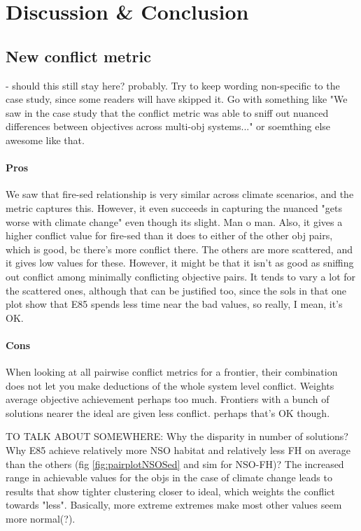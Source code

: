 \section{Discussion \& Conclusion}
\subsection{New conflict metric} - should this still stay here? probably. Try to keep wording non-specific to the case study, since some readers will have skipped it. Go with something like "We saw in the case study that the conflict metric was able to sniff out nuanced differences between objectives across multi-obj systems..." or soemthing else awesome like that.

\paragraph{Pros}
We saw that fire-sed relationship is very similar across climate scenarios, and the metric captures this. However, it even succeeds in capturing the nuanced "gets worse with climate change" even though its slight. Man o man.
Also, it gives a higher conflict value for fire-sed than it does to either of the other obj pairs, which is good, bc there's more conflict there. The others are more scattered, and it gives low values for these.
However, it might be that it isn't as good as sniffing out conflict among minimally conflicting objective pairs. It tends to vary a lot for the scattered ones, although that can be justified too, since the sols in that one plot show that E85 spends less time near the bad values, so really, I mean, it's OK.

\paragraph{Cons}
When looking at all pairwise conflict metrics for a frontier, their combination does not let you make deductions of the whole system level conflict.
Weights average objective achievement perhaps too much. Frontiers with a bunch of solutions nearer the ideal are given less conflict. perhaps that's OK though.


TO TALK ABOUT SOMEWHERE:
Why the disparity in number of solutions?
Why E85 achieve relatively more NSO habitat and relatively less FH on average than the others (fig \ref{fig:pairplotNSOSed} and sim for NSO-FH)?
The increased range in achievable values for the objs in the case of climate change leads to results that show tighter clustering closer to ideal, which weights the conflict towards "less". Basically, more extreme extremes make most other values seem more normal(?).

